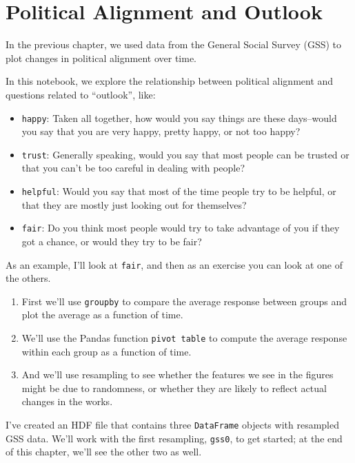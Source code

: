 \hypertarget{political-alignment-and-outlook}{%
\chapter{Political Alignment and
Outlook}\label{political-alignment-and-outlook}}

In the previous chapter, we used data from the General Social Survey
(GSS) to plot changes in political alignment over time.

In this notebook, we explore the relationship between political
alignment and questions related to ``outlook'', like:

\begin{itemize}
\item
  \passthrough{\lstinline!happy!}: Taken all together, how would you say
  things are these days--would you say that you are very happy, pretty
  happy, or not too happy?
\item
  \passthrough{\lstinline!trust!}: Generally speaking, would you say
  that most people can be trusted or that you can't be too careful in
  dealing with people?
\item
  \passthrough{\lstinline!helpful!}: Would you say that most of the time
  people try to be helpful, or that they are mostly just looking out for
  themselves?
\item
  \passthrough{\lstinline!fair!}: Do you think most people would try to
  take advantage of you if they got a chance, or would they try to be
  fair?
\end{itemize}

As an example, I'll look at \passthrough{\lstinline!fair!}, and then as
an exercise you can look at one of the others.

\begin{enumerate}
\def\labelenumi{\arabic{enumi}.}
\item
  First we'll use \passthrough{\lstinline!groupby!} to compare the
  average response between groups and plot the average as a function of
  time.
\item
  We'll use the Pandas function \passthrough{\lstinline!pivot table!} to
  compute the average response within each group as a function of time.
\item
  And we'll use resampling to see whether the features we see in the
  figures might be due to randomness, or whether they are likely to
  reflect actual changes in the works.
\end{enumerate}

I've created an HDF file that contains three
\passthrough{\lstinline!DataFrame!} objects with resampled GSS data.
We'll work with the first resampling, \passthrough{\lstinline!gss0!}, to
get started; at the end of this chapter, we'll see the other two as
well.

